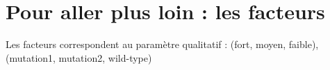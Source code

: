 \section{Pour aller plus loin : les facteurs}
Les facteurs correspondent au paramètre qualitatif : (fort, moyen, faible), (mutation1, mutation2, wild-type) 


